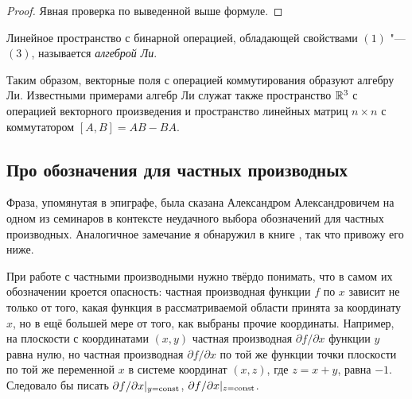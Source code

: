\begin{proof}
	Явная проверка по выведенной выше формуле.
\end{proof}

\begin{definition}
	Линейное пространство с бинарной операцией, обладающей свойствами $(1)$ "---$(3)$, называется \textit{алгеброй Ли}.
\end{definition}

Таким образом, векторные поля с операцией коммутирования образуют алгебру Ли. Известными примерами алгебр Ли служат также пространство $\mathbb{R}^3$ с операцией векторного произведения и пространство линейных матриц $n \times n$ с коммутатором $[A, B] = AB - BA$.

\subsection{Про обозначения для частных производных}

Фраза, упомянутая в эпиграфе, была сказана Александром Александровичем на одном из семинаров в контексте неудачного выбора обозначений для частных производных. Аналогичное замечание я обнаружил в книге \cite{A24}, так что привожу его ниже.

При работе с частными производными нужно твёрдо понимать, что в самом их обозначении кроется опасность: частная производная функции $f$ по $x$ зависит не только от того, какая функция в рассматриваемой области принята за координату $x$, но в ещё большей мере от того, как выбраны прочие координаты. Например, на плоскости с координатами $(x, y)$ частная производная $\partial f / \partial x$ функции $y$ равна нулю, но частная производная $\partial f / \partial x$ по той же функции точки плоскости по той же переменной $x$ в системе координат $(x, z)$, где $z = x + y$, равна $-1$. Следовало бы писать $\partial f / \partial x|_{y = \mathrm{const}}$, $\partial f / \partial x|_{z = \mathrm{const}}$.

